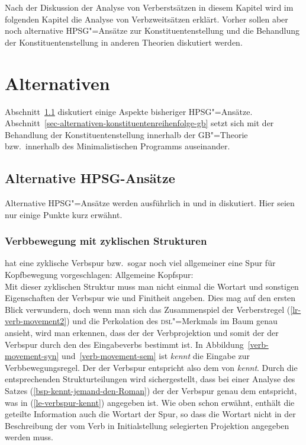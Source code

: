 \noindent
Nach der Diskussion der Analyse von Verberstsätzen in diesem Kapitel wird im folgenden Kapitel
die Analyse von Verbzweitsätzen erklärt. Vorher sollen aber noch alternative HPSG"=Ansätze zur Konstituentenstellung
und die Behandlung der Konstituentenstellung in anderen Theorien diskutiert werden.

\section{Alternativen}

Abschnitt~\ref{sec-konstituentenreihenfolge-alternativen} diskutiert einige Aspekte bisheriger
HPSG"=Ansätze. Abschnitt~\ref{sec-alternativen-konstituentenreihenfolge-gb} setzt sich mit der
Behandlung der Konstituentenstellung innerhalb der GB"=Theorie bzw.\ innerhalb des Minimalistischen
Programms auseinander.

\subsection{Alternative HPSG-Ansätze}
\label{sec-konstituentenreihenfolge-alternativen}

Alternative HPSG"=Ansätze werden ausführlich in  und in
 diskutiert. Hier seien nur einige Punkte kurz erwähnt.

\subsubsection{Verbbewegung mit zyklischen Strukturen}
\label{sec-Verbbewegung mit zyklischen Strukturen}

\citet[207]{Meurers2000b} hat eine zyklische Verbspur bzw.\ sogar noch viel allgemeiner eine Spur
für Kopfbewegung vorgeschlagen:
\eas
\label{le-verbspur}%
Allgemeine Kopfspur:\\
\zs
Mit dieser zyklischen Struktur muss man nicht einmal die Wortart und sonstigen Eigenschaften der
Verbspur wie \initialw und Finitheit angeben. Dies mag auf den ersten Blick verwundern, doch wenn
man sich das Zusammenspiel der Verberstregel (\ref{lr-verb-movement2}) und die Perkolation des
\textsc{dsl}"=Merkmals im Baum genau ansieht, wird man erkennen, dass der \dslw der Verbprojektion
und somit der \localw der Verbspur durch den \localw des Eingabeverbs bestimmt ist. In
Abbildung~\ref{verb-movement-syn} und~\ref{verb-movement-sem} ist \emph{kennt} die Eingabe zur
Verbbewegungsregel. Der \localw der Verbspur entspricht also dem \localw von \emph{kennt}. Durch die
entsprechenden Strukturteilungen wird sichergestellt, dass bei einer Analyse des Satzes
(\ref{bsp-kennt-jemand-den-Roman}) der \localw der Verbspur genau dem entspricht, was in
(\ref{le-verbspur-kennt}) angegeben ist. Wie oben schon erwähnt, enthält die geteilte Information
auch die Wortart der Spur, so dass die Wortart nicht in der Beschreibung der vom Verb in
Initialstellung selegierten Projektion angegeben werden muss.

